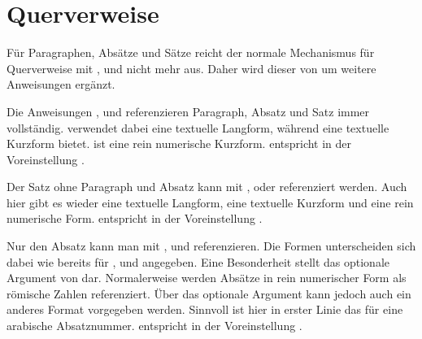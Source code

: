 \section{Querverweise}

Für Paragraphen, Absätze und Sätze reicht der normale Mechanismus für
Querverweise mit ,
 und  nicht mehr aus. Daher wird dieser von
 um weitere Anweisungen ergänzt.

\begin{Declaration}
\end{Declaration}
Die Anweisungen ,  und 
referenzieren Paragraph, Absatz und Satz immer vollständig. 
verwendet dabei eine textuelle Langform, während  eine textuelle
Kurzform bietet.  ist eine rein numerische Kurzform. 
entspricht in der Voreinstellung .%
\EndIndexGroup


\begin{Declaration}
\end{Declaration}
Der Satz ohne Paragraph und Absatz kann mit ,
 oder  referenziert werden. Auch hier
gibt es wieder eine textuelle Langform, eine textuelle Kurzform und eine rein
numerische Form.  entspricht in der
Voreinstellung .%
\EndIndexGroup


\begin{Declaration}
\end{Declaration}
Nur den Absatz kann man mit ,  und
 referenzieren. Die Formen unterscheiden sich dabei wie bereits
für ,  und
 angegeben. Eine Besonderheit stellt das
optionale Argument von  dar. Normalerweise werden Absätze in
rein numerischer Form als römische Zahlen referenziert. Über das optionale
Argument kann jedoch auch ein anderes Format vorgegeben werden. Sinnvoll ist
hier in erster Linie das   für eine
arabische Absatznummer.  entspricht in der
Voreinstellung .%
\EndIndexGroup


